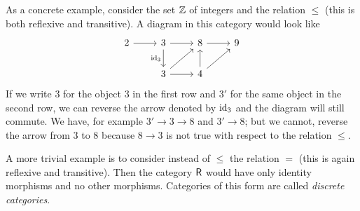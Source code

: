 \begin{example}
    As a concrete example, consider the set \(\mathbb{Z}\) of integers and the relation
    \(\leq\) (this is both reflexive and transitive). A diagram in this category
    would look like
    \[
        \begin{tikzcd}
            2 \arrow[r] & 3 \arrow[r] \arrow[d, "\id_3"'] & 8 \arrow[r]            & 9 \\
                        & 3 \arrow[r] \arrow[ru]          & 4 \arrow[u] \arrow[ru] &  
        \end{tikzcd}
    \]
    If we write \(3\) for the object \(3\) in the first row and \(3'\) for the
    same object in the second row, we can reverse the arrow denoted by \(\operatorname{id}_3\)
    and the diagram will still commute. We have, for example \(3' \to 3 \to 8\)
    and \(3' \to 8\); but we cannot, reverse the arrow from \(3\) to \(8\)
    because \(8 \to 3\) is not true with respect to the relation \(\leq\).

    A more trivial example is to consider instead of \(\leq\) the relation \(=\)
    (this is again reflexive and transitive). Then the category \(\mathsf{R}\)
    would have only identity morphisms and no other morphisms. Categories of
    this form are called \emph{discrete categories}.
\end{example}